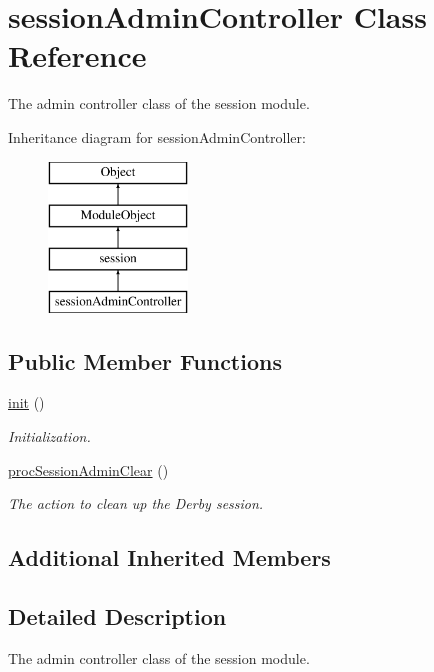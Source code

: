 \hypertarget{classsessionAdminController}{}\section{session\+Admin\+Controller Class Reference}
\label{classsessionAdminController}


The admin controller class of the session module.  


Inheritance diagram for session\+Admin\+Controller\+:\begin{figure}[H]
\begin{center}
\leavevmode
\includegraphics[height=4.000000cm]{classsessionAdminController}
\end{center}
\end{figure}
\subsection*{Public Member Functions}
\begin{DoxyCompactItemize}
\item 
\hyperlink{classsessionAdminController_a9865e37281a061bded58fa3f00478ee5}{init} ()
\begin{DoxyCompactList}\small\item\em Initialization. \end{DoxyCompactList}\item 
\hyperlink{classsessionAdminController_a502f604c9f27f92d5a6fb8e1c7409ca4}{proc\+Session\+Admin\+Clear} ()
\begin{DoxyCompactList}\small\item\em The action to clean up the Derby session. \end{DoxyCompactList}\end{DoxyCompactItemize}
\subsection*{Additional Inherited Members}


\subsection{Detailed Description}
The admin controller class of the session module. 

